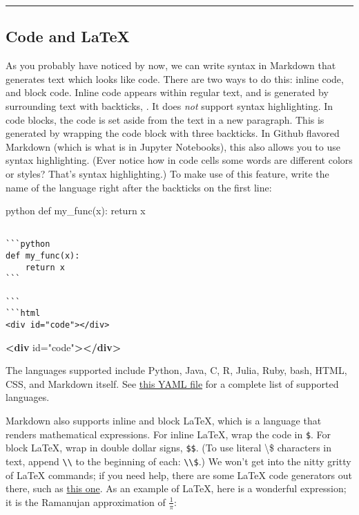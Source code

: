\documentclass[11pt]{article}
\newenvironment{Shaded}{}{}
\newcommand{\KeywordTok}[1]{\textcolor[rgb]{0.00,0.44,0.13}{\textbf{{#1}}}}
\newcommand{\StringTok}[1]{\textcolor[rgb]{0.25,0.44,0.63}{{#1}}}
\newcommand{\OtherTok}[1]{\textcolor[rgb]{0.00,0.44,0.13}{{#1}}}
\begin{document}
\begin{center}\rule{0.5\linewidth}{\linethickness}\end{center}

    \hypertarget{code}{}

\hypertarget{code-and-latex}{%
\subsection{Code and LaTeX}\label{code-and-latex}}

As you probably have noticed by now, we can write syntax in Markdown
that generates text which looks like code. There are two ways to do
this: inline code, and block code. Inline code appears within regular
text, and is generated by surrounding text with backticks,
\texttt{\textasciigrave{}}. It does \emph{not} support syntax
highlighting. In code blocks, the code is set aside from the text in a
new paragraph. This is generated by wrapping the code block with three
backticks. In Github flavored Markdown (which is what is in Jupyter
Notebooks), this also allows you to use syntax highlighting. (Ever
notice how in code cells some words are different colors or styles?
That's syntax highlighting.) To make use of this feature, write the name
of the language right after the backticks on the first line:

\texttt{}python def my\_func(x): return x

\begin{verbatim}

```python
def my_func(x):
    return x
```

```
```html
<div id="code"></div>
\end{verbatim}

\begin{Shaded}
\begin{Highlighting}[]
\KeywordTok{<div}\OtherTok{ id=}\StringTok{"code"}\KeywordTok{></div>}
\end{Highlighting}
\end{Shaded}

The languages supported include Python, Java, C, R, Julia, Ruby, bash,
HTML, CSS, and Markdown itself. See
\href{https://github.com/github/linguist/blob/master/lib/linguist/languages.yml}{this
YAML file} for a complete list of supported languages.

Markdown also supports inline and block LaTeX, which is a language that
renders mathematical expressions. For inline LaTeX, wrap the code in
\texttt{\$}. For block LaTeX, wrap in double dollar signs,
\texttt{\$\$}. (To use literal \textbackslash{}\$ characters in text,
append \texttt{\textbackslash{}\textbackslash{}} to the beginning of
each: \texttt{\textbackslash{}\textbackslash{}\$}.) We won't get into
the nitty gritty of LaTeX commands; if you need help, there are some
LaTeX code generators out there, such as
\href{https://www.codecogs.com/latex/eqneditor.php}{this one}. As an
example of LaTeX, here is a wonderful expression; it is the Ramanujan
approximation of \(\frac{1}{\pi}\):
\end{document}
